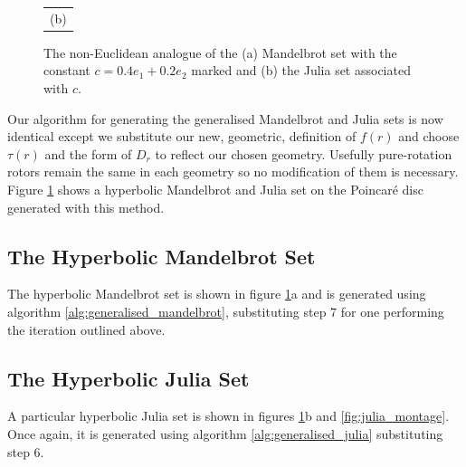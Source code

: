 \begin{figure}[p]
\begin{tabular}{c}
                          (b)
\end{tabular}
\caption{\label{fig:noneuclidean_sets}The non-Euclidean analogue of the (a) Mandelbrot set with
  the constant $c = 0.4e_1 + 0.2e_2$ marked and (b) the Julia
  set associated with $c$.}
\end{figure}

Our algorithm for generating the generalised Mandelbrot and Julia sets is now identical
except we substitute our new, geometric, definition of $f(r)$ and choose $\tau(r)$
and the form of $D_r$ to reflect our chosen geometry. Usefully pure-rotation rotors remain
the same in each geometry so no modification of them is necessary. Figure
\ref{fig:noneuclidean_sets} shows a hyperbolic Mandelbrot and Julia set on the
Poincar\'e disc generated with this method. 

\subsection{The Hyperbolic Mandelbrot Set}

The hyperbolic Mandelbrot set is shown in figure \ref{fig:noneuclidean_sets}a and
is generated using algorithm \ref{alg:generalised_mandelbrot}, substituting
step 7 for one performing the iteration outlined above. 

\subsection{The Hyperbolic Julia Set}

A particular hyperbolic Julia set is shown in figures \ref{fig:noneuclidean_sets}b
and \ref{fig:julia_montage}.  Once again, it is generated using algorithm
\ref{alg:generalised_julia} substituting step 6.

